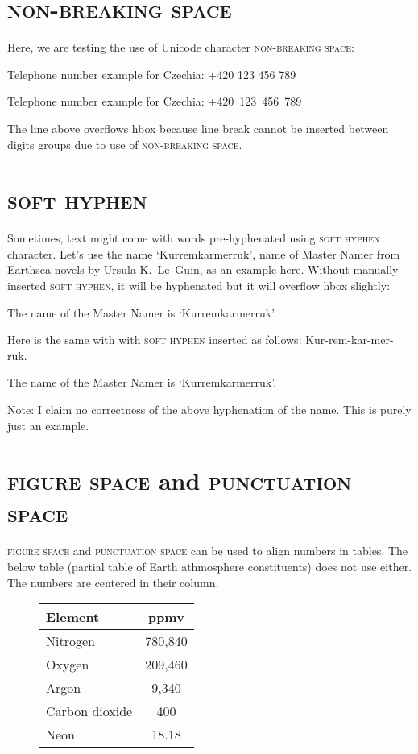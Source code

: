 \documentclass{article}
\DeclareRobustCommand{\expl}[1]{\textsf{#1}}
\newcommand{\nbsp}{\textsc{non-breaking space}}
\newcommand{\shy}{\textsc{soft hyphen}}
\newcommand{\figuresp}{\textsc{figure space}}
\newcommand{\punctsp}{\textsc{punctuation space}}
\begin{document}
\pagebreak

\section{\nbsp{}}

\expl{Here, we are testing the use of Unicode character \nbsp{}:}

Telephone number example for Czechia: +420 123 456 789

Telephone number example for Czechia: +420 123 456 789

\expl{The line above overflows hbox because line break cannot be inserted
  between digits groups due to use of \nbsp{}.}

\pagebreak

\section{\shy{}}
\expl{Sometimes, text might come with words pre-​hyphenated using \shy{}
  character. Let's use the name `Kurremkarmerruk', name of Master Namer from
  Earthsea novels by Ursula K.\ Le~Guin, as an example here. Without manually
  inserted \shy{}, it will be hyphenated but it will overflow hbox slightly:}

The name of the Master Namer is `Kurremkarmerruk'.

\expl{Here is the same with with \shy{} inserted as follows:
  Kur-rem-kar-mer-ruk.}

The name of the Master Namer is `Kur­rem­kar­mer­ruk'.

\expl{Note: I claim no correctness of the above hyphenation of the name. This
  is purely just an example.}

\pagebreak

\section{\figuresp{} and \punctsp{}}

\expl{\figuresp{} and \punctsp{} can be used to align numbers in tables. The
  below table (partial table of Earth athmosphere constituents) does not use
  either. The numbers are centered in their column.}

\begin{figure}[H]
\centering
\begin{tabular}{l | c}
  Element & ppmv \tabularnewline
  \hline
  Nitrogen &     780,840\tabularnewline
  Oxygen &       209,460\tabularnewline
  Argon &          9,340\tabularnewline
  Carbon dioxide &   400 \tabularnewline
  Neon &               18.18
\end{tabular}
\end{figure}
\end{document}
